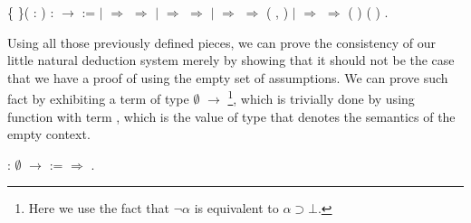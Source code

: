 \begin{coqdoccode}
\coqdocemptyline
\coqdocnoindent
{}  \{ \}( :   )\coqdoceol
\coqdocindent{1.00em}
:   \ensuremath{\rightarrow}   :=\coqdoceol
\coqdocindent{1.00em}
  \coqdoceol
\coqdocindent{1.00em}
\ensuremath{|}   \ensuremath{\Rightarrow}   \ensuremath{\Rightarrow}    \coqdoceol
\coqdocindent{1.00em}
\ensuremath{|}   \ensuremath{\Rightarrow}   \ensuremath{\Rightarrow}\coqdoceol
\coqdocindent{3.00em}
     \coqdoceol
\coqdocindent{1.00em}
\ensuremath{|}   \ensuremath{\Rightarrow}    \ensuremath{\Rightarrow}   ( , )\coqdoceol
\coqdocindent{1.00em}
\ensuremath{|}    \ensuremath{\Rightarrow}   \ensuremath{\Rightarrow}\coqdoceol
\coqdocindent{3.00em}
(  ) (  )\coqdoceol
\coqdocindent{1.00em}
.\coqdoceol
\coqdocemptyline
\end{coqdoccode}
Using all those previously defined pieces, we can prove the consistency of our little natural
deduction system merely by showing that it should not be the case that we have a proof of 
using the empty set of assumptions. We can prove such fact by exhibiting a term of type
 $\emptyset$  \ensuremath{\rightarrow} \footnote{Here we use the fact that $\neg \alpha$ is
equivalent to $\alpha \supset \bot$.}, which is trivially done by using function  with term
, which is the value of type  that denotes the semantics of the empty context.
 \begin{coqdoccode}
\coqdocemptyline
\coqdocnoindent
{}  :  $\emptyset$  \ensuremath{\rightarrow} \coqdoceol
\coqdocindent{1.00em}
:=   \ensuremath{\Rightarrow}   .\coqdoceol
\coqdocemptyline
\end{coqdoccode}
